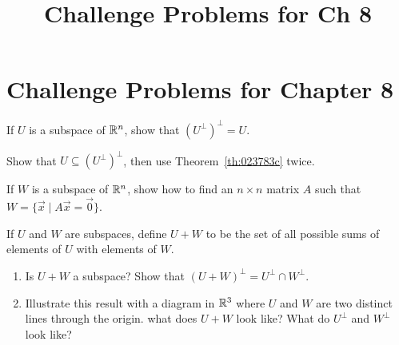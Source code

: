\documentclass{ximera}
\title{Challenge Problems for Ch 8} \license{CC BY-NC-SA 4.0}
\begin{document}
\begin{abstract}
\end{abstract}
\maketitle

\section*{Challenge Problems for Chapter 8}

\begin{problem}\label{prob:8_1_13}
If $U$ is a subspace of $\mathbb{R}^n$, show that $\left(U^{\perp}\right)^\perp = U$. 
\begin{hint}
Show that $U \subseteq \left(U^{\perp}\right)^\perp$, then use Theorem~\ref{th:023783c} twice.
\end{hint}
\end{problem}


\begin{problem}\label{prob:8_1_14}
If $W$ is a subspace of $\mathbb{R}^n$, show how to find an $n \times n$ matrix $A$ such that $W = \{\vec{x} \mid A\vec{x} = \vec{0}\}$. 


\end{problem}

\begin{problem}\label{prob:8_1_16}
If $U$ and $W$ are subspaces, define $U+W$ to be the set of all possible sums of elements of $U$ with elements of $W$.

\begin{enumerate} 
\item Is $U+W$ a subspace?
Show that $(U + W)^\perp = U^\perp \cap W^\perp$. 
\item Illustrate this result with a diagram in $\mathbb{R}^3$ where $U$ and $W$ are two distinct lines through the origin.  what does $U+W$ look like?  What do $U^{\perp}$ and $W^{\perp}$ look like?
\end{enumerate}
\end{problem}
\end{document}
